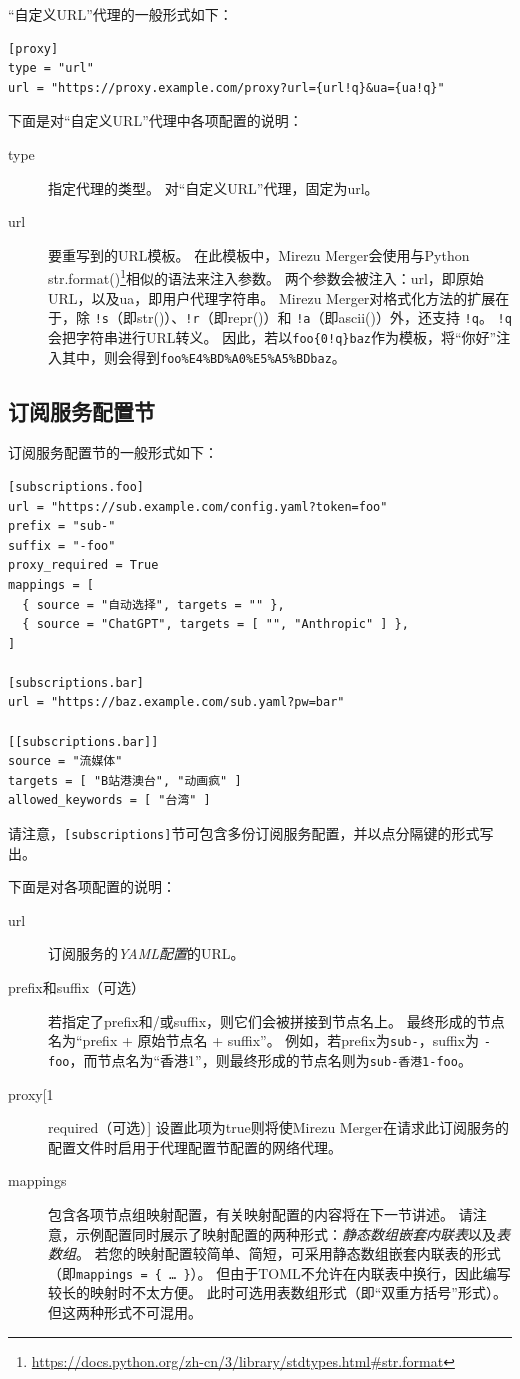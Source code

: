 \documentclass[a4paper,fontset=founder,punct=kaiming]{ctexart}
\renewcommand\_{\textunderscore\linebreak[1]}
\newcommand{\productname}{Mirezu Merger}
\begin{document}
“自定义URL”代理的一般形式如下：
\begin{verbatim}
[proxy]
type = "url"
url = "https://proxy.example.com/proxy?url={url!q}&ua={ua!q}"
\end{verbatim}

下面是对“自定义URL”代理中各项配置的说明：
\begin{description}
\item[type] 指定代理的类型。
  对“自定义URL”代理，固定为url。
\item[url] 要重写到的URL模板。
  在此模板中，\productname 会使用与Python str.format()\footnote{\url{https://docs.python.org/zh-cn/3/library/stdtypes.html\#str.format}}相似的语法来注入参数。
  两个参数会被注入：url，即原始URL，以及ua，即用户代理字符串。
  \productname 对格式化方法的扩展在于，除 \texttt{!s}（即str()）、\texttt{!r}（即repr()）和 \texttt{!a}（即ascii()）外，还支持 \texttt{!q}。
  \texttt{!q}会把字符串进行URL转义。
  因此，若以\verb|foo{0!q}baz|作为模板，将“你好”注入其中，则会得到\texttt{foo\%E4\%BD\%A0\%E5\%A5\%BDbaz}。
\end{description}

\subsection{订阅服务配置节}
\label{sec:subconf}

订阅服务配置节的一般形式如下：
\begin{verbatim}
[subscriptions.foo]
url = "https://sub.example.com/config.yaml?token=foo"
prefix = "sub-"
suffix = "-foo"
proxy_required = True
mappings = [
  { source = "自动选择", targets = "" },
  { source = "ChatGPT", targets = [ "", "Anthropic" ] },
]

[subscriptions.bar]
url = "https://baz.example.com/sub.yaml?pw=bar"

[[subscriptions.bar]]
source = "流媒体"
targets = [ "B站港澳台", "动画疯" ]
allowed_keywords = [ "台湾" ]
\end{verbatim}
请注意，\texttt{[subscriptions]}节可包含多份订阅服务配置，并以点分隔键的形式写出。

下面是对各项配置的说明：
\begin{description}
\item[url] 订阅服务的\emph{YAML配置}的URL。
\item[prefix和suffix（可选）] 若指定了prefix和/或suffix，则它们会被拼接到节点名上。
  最终形成的节点名为“prefix + 原始节点名 + suffix”。
  例如，若prefix为\texttt{sub-}，suffix为 \texttt{-foo}，而节点名为“香港1”，则最终形成的节点名则为\texttt{sub-香港1-foo}。
\item[proxy\_required（可选）] 设置此项为true则将使\productname 在请求此订阅服务的配置文件时启用于代理配置节配置的网络代理。
\item[mappings] 包含各项节点组映射配置，有关映射配置的内容将在下一节讲述。
  请注意，示例配置同时展示了映射配置的两种形式：\emph{静态数组嵌套内联表}以及\emph{表数组}。
  若您的映射配置较简单、简短，可采用静态数组嵌套内联表的形式（即\texttt{mappings = \{ \ldots{} \}}）。
  但由于TOML不允许在内联表中换行，因此编写较长的映射时不太方便。
  此时可选用表数组形式（即“双重方括号”形式）。
  但这两种形式不可混用。
\end{description}
\end{document}
